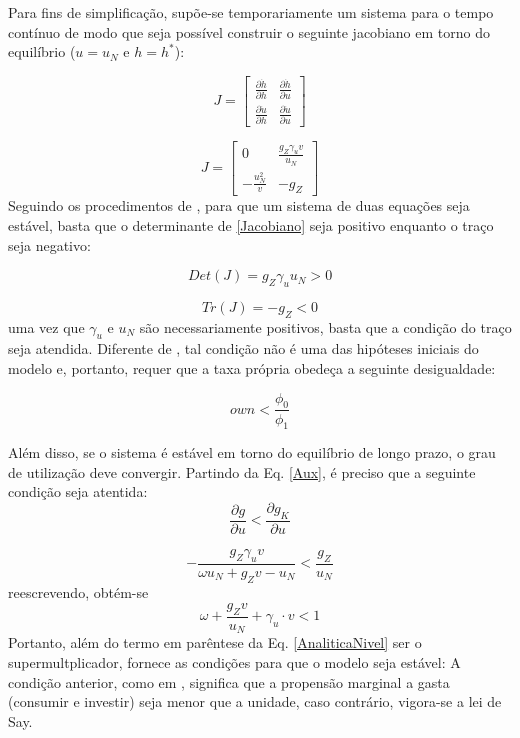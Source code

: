 Para fins de simplificação, supõe-se temporariamente um sistema para o tempo contínuo de modo que seja possível construir o seguinte jacobiano em torno do equilíbrio ($u = u_N$ e $h = h^*$):

$$
J = 
\left[\begin{matrix}
\frac{\partial \dot h}{\partial h} & \frac{\partial \dot h}{\partial u}\\
\frac{\partial \dot u}{\partial h} & \frac{\partial \dot u}{\partial u}
\end{matrix}\right]
$$

\begin{equation}
J = 
\label{Jacobiano}
\left[\begin{matrix}0 & \frac{g_Z \gamma_{u} v}{u_N}\\- \frac{u_N^{2}}{v} & - g_Z\end{matrix}\right]
\end{equation}
Seguindo os procedimentos de \textcite{gandolfo_economic_2010}, para que um sistema de duas equações seja estável, basta que o determinante de \ref{Jacobiano} seja positivo enquanto o traço seja negativo:

$$
Det(J) = g_Z \gamma_{u} u_N > 0
$$

$$
Tr(J) = -g_Z < 0
$$
uma vez que $\gamma_u$ e $u_N$ são necessariamente positivos, basta que a condição do traço seja atendida. Diferente de \textcite{freitas_growth_2015}, tal condição não é uma das hipóteses iniciais do modelo e, portanto, requer que a taxa própria obedeça a seguinte desigualdade:

\begin{equation}
own < \frac{\phi_0}{\phi_1}
\end{equation}

Além disso, se o sistema é estável em torno do equilíbrio de longo prazo, o grau de utilização deve convergir. Partindo da Eq. \ref{Aux}, é preciso que a seguinte condição seja atentida:
$$
\frac{\partial g}{\partial u} < \frac{\partial g_K}{\partial u}
$$

$$
- \frac{g_Z \gamma_{u} v}{\omega u_N + g_Z v - u_N} < \frac{g_Z}{u_N}
$$
reescrevendo, obtém-se
\begin{equation}
\omega + \frac{g_Z v}{u_N} + \gamma_u\cdot v < 1
\end{equation}
Portanto, além do termo em parêntese da Eq. \ref{AnaliticaNivel} ser o supermultplicador, fornece as condições para que o modelo seja estável: 
A condição anterior, como em \textcite{freitas_growth_2015}, significa que a propensão marginal a gasta (consumir e investir) seja menor que a unidade, caso contrário, vigora-se a lei de Say.



